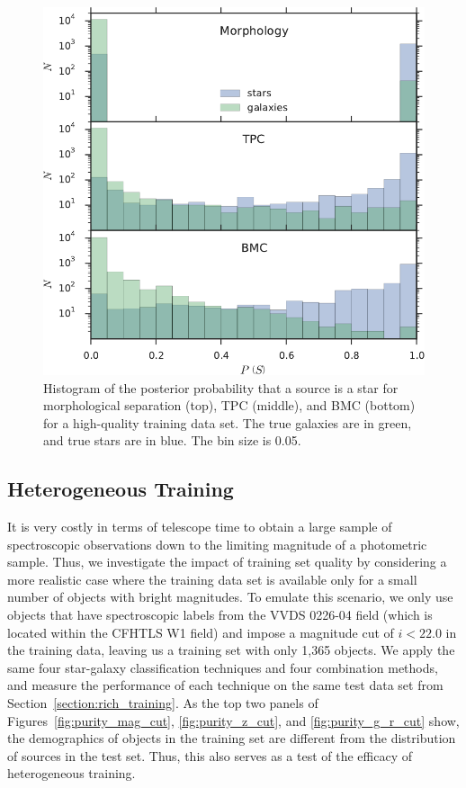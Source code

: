 \documentclass[useAMS,usenatbib]{mn2e}
\begin{document}
\begin{figure}
  \includegraphics[width=\columnwidth]{figures/p_dist.pdf}
  \caption{Histogram of the posterior probability that
           a source is a star for morphological separation (top),
           TPC (middle), and BMC (bottom)
           for a high-quality training data set.
           The true galaxies are in green, and true stars are in blue.
           The bin size is 0.05.}
  \label{fig:p_dist_all}
\end{figure}



\subsection{Heterogeneous Training}
  \label{section:poor_training}
 
It is very costly in terms of telescope time to
obtain a large sample of spectroscopic observations
down to the limiting magnitude of a photometric sample.
Thus, we investigate the impact of training set quality
by considering a more realistic case
where the training data set is available
only for a small number of objects with bright magnitudes.
To emulate this scenario,
we only use objects that have spectroscopic labels
from the VVDS 0226-04 field (which is located within the CFHTLS W1 field)
and impose a magnitude cut of $i < 22.0$ in the training data,
leaving us a training set with only 1,365 objects.
We apply the same four star-galaxy classification techniques
and four combination methods,
and measure the performance of each technique on the same test data set
from Section~\ref{section:rich_training}.
As the top two panels of Figures~\ref{fig:purity_mag_cut},
\ref{fig:purity_z_cut}, and \ref{fig:purity_g_r_cut} show,
the demographics of objects in the training set
are different from the distribution of sources in the test set.
Thus, this also serves as a test of the efficacy of heterogeneous training.
\end{document}
